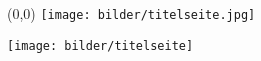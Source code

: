 \begin{titlepage}
\ifpdf
\begin{textblock}{3}(0,0)
\texttt{[image: bilder/titelseite.jpg]}
\end{textblock}
\leavevmode\newpage 
%
\else
\texttt{[image: bilder/titelseite]}
\fi
\end{titlepage}
